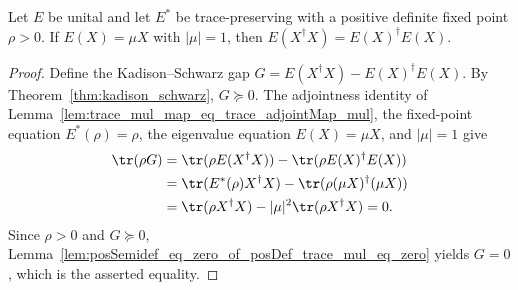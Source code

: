\begin{theorem}
    \label{thm:ks_equality_of_peripheral_eigenvector_of_fixedPoint}
    \leanok
    Let $E$ be unital and let $E^*$ be trace-preserving with a positive
    definite fixed point $\rho > 0$. If $E(X) = \mu X$ with $|\mu| = 1$, then
    $E(X^\dagger X) = E(X)^\dagger E(X)$.
\end{theorem}

\begin{proof}
    \leanok
    Define the Kadison--Schwarz gap
    $G=E(X^\dagger X)-E(X)^\dagger E(X)$. By
    Theorem~\ref{thm:kadison_schwarz}, $G\succeq0$. The adjointness identity of
    Lemma~\ref{lem:trace_mul_map_eq_trace_adjointMap_mul}, the fixed-point
    equation $E^*(\rho)=\rho$, the eigenvalue equation $E(X)=\mu X$, and
    $|\mu|=1$ give
    \begin{align}
        \tr(\rho G)
         & =\tr(\rho E(X^\dagger X))
        -\tr(\rho E(X)^\dagger E(X)) \notag     \\
         & =\tr(E^*(\rho)X^\dagger X)
        -\tr(\rho(\mu X)^\dagger(\mu X)) \notag \\
         & =\tr(\rho X^\dagger X)
        -|\mu|^2\tr(\rho X^\dagger X)
        =0.
        \notag
    \end{align}
    Since $\rho>0$ and $G\succeq0$,
    Lemma~\ref{lem:posSemidef_eq_zero_of_posDef_trace_mul_eq_zero} yields
    $G=0$, which is the asserted equality.
\end{proof}
